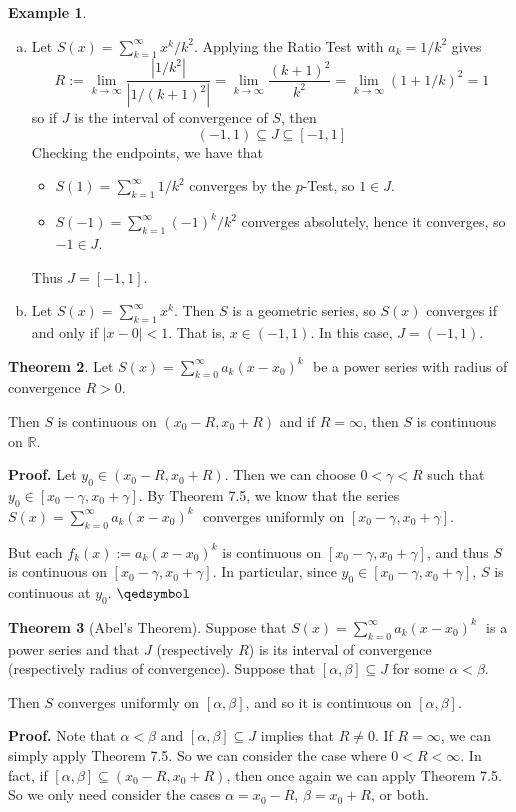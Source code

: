 \documentclass[11pt]{article}
\theoremstyle{definition}
\newtheorem{thm}{Theorem}[section]
\newtheorem{exmp}[thm]{Example}
\newcommand{\mbR}{\ensuremath{\mathbb{R}}}
\newcommand{\powerseries}{\ensuremath{S(x) = \sum_{k=0}^\infty a_k (x - x_0)^k \text{ }}}
\begin{document}
\begin{exmp}~
\begin{enumerate}[(a)] \vspace{-0.2cm}

\item Let $S(x) = \sum_{k=1}^\infty x^k / k^2$. Applying the Ratio Test with $a_k = 1/k^2$ gives
$$R := \lim_{k\to\infty} \frac{|1/k^2|}{|1/(k+1)^2|} = \lim_{k\to\infty} \frac{(k+1)^2}{k^2} = \lim_{k\to\infty} (1 + 1/k)^2 = 1$$
so if $J$ is the interval of convergence of $S$, then
$$(-1, 1) \subseteq J \subseteq [-1, 1]$$
Checking the endpoints, we have that
\begin{itemize}
\item $S(1) = \sum_{k=1}^\infty 1/k^2$ converges by the $p$-Test, so $1 \in J$.
\item $S(-1) = \sum_{k=1}^\infty (-1)^k / k^2$ converges absolutely, hence it converges, so $-1 \in J$.
\end{itemize}
Thus $J = [-1, 1]$.

\item Let $S(x) = \sum_{k=1}^\infty x^k$. Then $S$ is a geometric series, so $S(x)$ converges if and only if $|x - 0| < 1$. That is, $x \in (-1, 1)$. In this case, $J = (-1, 1)$. 

\end{enumerate}
\end{exmp}

\begin{thm}
Let \powerseries be a power series with radius of convergence $R > 0$.

Then $S$ is continuous on $(x_0 - R, x_0 + R)$ and if $R = \infty$, then $S$ is continuous on $\mbR$. 
\end{thm}
\textbf{Proof.} Let $y_0 \in (x_0 - R, x_0 + R)$. Then we can choose $0 < \gamma < R$ such  that $y_0 \in [x_0 - \gamma, x_0 + \gamma]$. By Theorem 7.5, we know that the series \powerseries converges uniformly on $[x_0 - \gamma, x_0 + \gamma]$. 

But each $f_k(x) := a_k(x - x_0)^k$ is continuous on $[x_0 - \gamma, x_0 + \gamma]$, and thus $S$ is continuous on $[x_0 - \gamma, x_0 + \gamma]$. In particular, since $y_0 \in [x_0 - \gamma, x_0 + \gamma]$, $S$ is continuous at $y_0$. $\qedsymbol$

\begin{thm}[Abel's Theorem]
Suppose that \powerseries is a power series and that $J$ (respectively $R$) is its interval of convergence (respectively radius of convergence). Suppose that $[\alpha, \beta] \subseteq J$ for some $\alpha < \beta$. 

Then $S$ converges uniformly on $[\alpha, \beta]$, and so it is continuous on $[\alpha, \beta]$.
\end{thm}
\textbf{Proof.} Note that $\alpha < \beta$ and $[\alpha, \beta] \subseteq J$ implies that $R \ne 0$. If $R = \infty$, we can simply apply Theorem 7.5. So we can consider the case where $0 < R < \infty$. In fact, if $[\alpha, \beta] \subseteq (x_0 - R, x_0 + R)$, then once again we can apply Theorem 7.5. So we only need consider the cases $\alpha = x_0 - R$, $\beta = x_0 + R$, or both.
\end{document}
